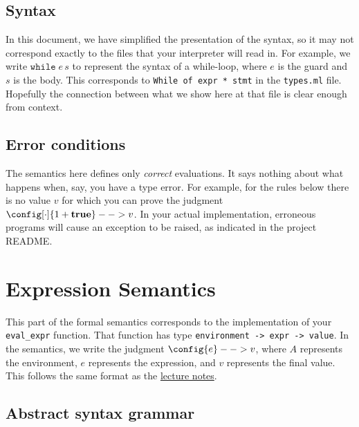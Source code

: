 \documentclass[10pt]{article}
\begin{document}
\subsection{Syntax}

In this document, we have simplified the presentation of the syntax,
so it may not correspond exactly to the files that your interpreter
will read in. For example, we write $\mathtt{while}\;e\,s$ to
represent the syntax of a while-loop, where $e$ is the guard and $s$
is the body. This corresponds to \texttt{While of expr * stmt} in the
\texttt{types.ml} file. Hopefully the connection between what we show
here at that file is clear enough from context.

\subsection{Error conditions}

The semantics here defines only \emph{correct} evaluations. It says
nothing about what happens when, say, you have a type error. For
example, for the rules below there is no value $v$ for which you can
prove the judgment $\config[\cdot]{1+\mathbf{true}} --> v$. In your actual
implementation, erroneous programs will cause an exception to be
raised, as indicated in the project README.

\section{Expression Semantics}

This part of the formal semantics corresponds to the implementation of
your \texttt{eval\_expr} function. That function has type
\texttt{environment -> expr -> value}. In the semantics, we write the
judgment $\config{e} --> v$, where $A$ represents the environment, $e$
represents the expression, and $v$ represents the final value. This
follows the same format as the \href{https://bakalian.cs.umd.edu/330/slides}{lecture notes}.

\subsection{Abstract syntax grammar}
\end{document}
